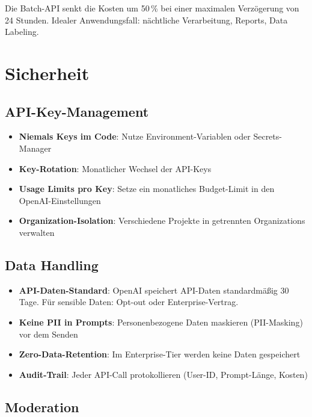 Die Batch-API senkt die Kosten um 50\,\% bei einer maximalen Verzögerung von 24 Stunden. Idealer Anwendungsfall: nächtliche Verarbeitung, Reports, Data Labeling.

\section{Sicherheit}

\subsection{API-Key-Management}

\begin{itemize}[leftmargin=*]
    \item \textbf{Niemals Keys im Code}: Nutze Environment-Variablen oder Secrets-Manager
    \item \textbf{Key-Rotation}: Monatlicher Wechsel der API-Keys
    \item \textbf{Usage Limits pro Key}: Setze ein monatliches Budget-Limit in den OpenAI-Einstellungen
    \item \textbf{Organization-Isolation}: Verschiedene Projekte in getrennten Organizations verwalten
\end{itemize}

\subsection{Data Handling}

\begin{itemize}[leftmargin=*]
    \item \textbf{API-Daten-Standard}: OpenAI speichert API-Daten standardmäßig 30 Tage. Für sensible Daten: Opt-out oder Enterprise-Vertrag.
    \item \textbf{Keine PII in Prompts}: Personenbezogene Daten maskieren (PII-Masking) vor dem Senden
    \item \textbf{Zero-Data-Retention}: Im Enterprise-Tier werden keine Daten gespeichert
    \item \textbf{Audit-Trail}: Jeder API-Call protokollieren (User-ID, Prompt-Länge, Kosten)
\end{itemize}

\subsection{Moderation}

